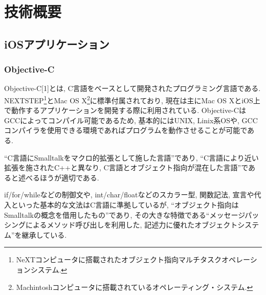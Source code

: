 \chapter{技術概要}
\label{chap:concept}

\section{iOSアプリケーション}
\subsection{Objective-C}
Objective-C[1]とは, C言語をベースとして開発されたプログラミング言語である.
NEXTSTEP\footnote{NeXTコンピュータに搭載されたオブジェクト指向マルチタスクオペレーションシステム.}とMac OS X\footnote{Machintoshコンピュータに搭載されているオペレーティング・システム.}に標準付属されており, 現在は主にMac OS XとiOS上で動作するアプリケーションを開発する際に利用されている.
Objective-CはGCCによってコンパイル可能であるため, 基本的にはUNIX, Linix系OSや, GCCコンパイラを使用できる環境であればプログラムを動作させることが可能である.

“C言語にSmalltalkをマクロ的拡張として施した言語”であり, “C言語により近い拡張を施されたC++と異なり, C言語とオブジェクト指向が混在した言語”であると述べるほうが適切である.

if/for/whileなどの制御文や, int/char/floatなどのスカラー型, 関数記法, 宣言や代入といった基本的な文法はC言語に準拠しているが, “オブジェクト指向はSmalltalkの概念を借用したもの”であり, その大きな特徴である“メッセージパッシングによるメソッド呼び出しを利用した, 記述力に優れたオブジェクトシステム”を継承している.

